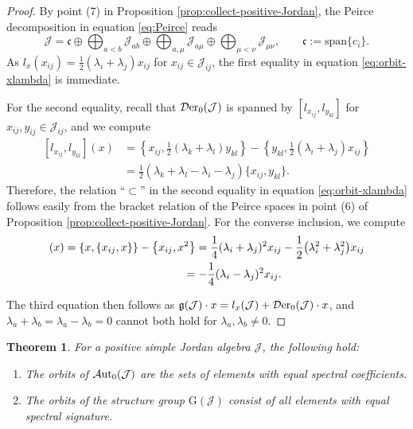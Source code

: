 \documentclass[10pt,a4paper]{amsart}
\numberwithin{equation}{section}
\newtheorem{Theorem}{Theorem}[section]
\newcommand{\Aut}{\mathcal{A}{\rm ut}}
\newcommand{\Der}{\mathcal{D}{\rm er}}
\newcommand{\Jcal}{\mathcal{J}}
\newcommand{\G}{\mathrm{G}}
\newcommand{\g}{{\mathfrak{g}}}
\newcommand{\cf}{{\mathfrak c}}
\newcommand{\sspan}{{\mathrm{span}}}
\begin{document}
\begin{proof}
By point (7) in Proposition \ref{prop:collect-positive-Jordan}, the Peirce decomposition in equation \eqref{eq:Peirce} reads
\[%
\Jcal = \cf \oplus \bigoplus_{a<b} \Jcal_{ab} \oplus \bigoplus_{a, \mu} \Jcal_{a\mu} \oplus \bigoplus_{\mu<\nu} \Jcal_{\mu\nu}, \qquad \cf := \sspan\{c_i\}.
\]
As $l_x(x_{ij}) = \frac12(\lambda_i + \lambda_j) x_{ij}$ for $x_{ij} \in \Jcal_{ij}$, the first equality in equation \eqref{eq:orbit-xlambda} is immediate.

For the second equality, recall that $\Der_0(\Jcal)$ is spanned by $[l_{x_{ij}}, l_{y_{kl}}]$ for $x_{ij}, y_{ij} \in \Jcal_{ij}$, and we compute
\begin{align*}
{}[l_{x_{ij}}, l_{y_{kl}}](x) & = \left\{x_{ij}, \frac12 (\lambda_k + \lambda_l) y_{kl}\right\} - \left\{y_{kl}, \frac12(\lambda_i + \lambda_j) x_{ij}\right\}\\
& = \frac12(\lambda_k + \lambda_l - \lambda_i - \lambda_j) \{x_{ij}, y_{kl}\}.
\end{align*}
Therefore, the relation ``$\subset$'' in the second equality in equation \eqref{eq:orbit-xlambda} follows easily from the bracket relation of the Peirce spaces in point (6) of Proposition \ref{prop:collect-positive-Jordan}.
For the converse inclusion, we compute
\begin{gather*}
 [l_x, l_{x_{ij}}](x)   = \{x, \{x_{ij}, x\}\} - \big\{x_{ij}, x^2\big\}
  = \frac14(\lambda_i + \lambda_j)^2 x_{ij} - \frac12\big(\lambda_i^2 + \lambda_j^2\big) x_{ij} \\
  \hphantom{[l_x, l_{x_{ij}}](x)}{}
  = - \frac14(\lambda_i - \lambda_j)^2 x_{ij}.
\end{gather*}

The third equation then follows as $\g(\Jcal) \cdot x = l_x(\Jcal) + \Der_0(\Jcal) \cdot x$, and $\lambda_a + \lambda_b = \lambda_a - \lambda_b = 0$ cannot both hold for $\lambda_a, \lambda_b \neq 0$.
\end{proof}


\begin{Theorem} \label{thm:orbits}
For a positive simple Jordan algebra $\Jcal$, the following hold:
\begin{enumerate}\itemsep=0pt
\item[$(1)$] The orbits of $\Aut_0(\Jcal)$ are the sets of elements with equal spectral coefficients.
\item[$(2)$] The orbits of the structure group $\G(\Jcal)$ consist of all elements with equal spectral signature.
\end{enumerate}
\end{Theorem}
\end{document}
